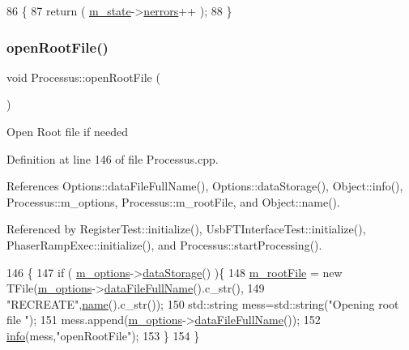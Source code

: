 \begin{DoxyCode}
86                                 \{
87   \textcolor{keywordflow}{return} ( \hyperlink{classProcessus_ab3539eee42891ceae0baf4395ae7fb61}{m\_state}->\hyperlink{structProcState_a51a0f54ba62b07e07ac8518c5f32828d}{nerrors}++ );
88 \}
\end{DoxyCode}
\mbox{\label{classProcessus_aacf6812880c1d1a2bf14a4a39458f443}} 
\subsubsection{\texorpdfstring{open\+Root\+File()}{openRootFile()}}
{\footnotesize\ttfamily void Processus\+::open\+Root\+File (\begin{DoxyParamCaption}{ }\end{DoxyParamCaption})\hspace{0.3cm}{\ttfamily [inherited]}}

Open Root file if needed 

Definition at line 146 of file Processus.\+cpp.



References Options\+::data\+File\+Full\+Name(), Options\+::data\+Storage(), Object\+::info(), Processus\+::m\+\_\+options, Processus\+::m\+\_\+root\+File, and Object\+::name().



Referenced by Register\+Test\+::initialize(), Usb\+F\+T\+Interface\+Test\+::initialize(), Phaser\+Ramp\+Exec\+::initialize(), and Processus\+::start\+Processing().


\begin{DoxyCode}
146                                \{
147   \textcolor{keywordflow}{if} ( \hyperlink{classProcessus_a74205f3c1e00c4448f7b3257c2351797}{m\_options}->\hyperlink{classOptions_aed7799d10139fa542055b982cb820192}{dataStorage}() )\{
148     \hyperlink{classProcessus_a76114f8cf2111e910c323a7ae05a015d}{m\_rootFile} = \textcolor{keyword}{new} TFile(\hyperlink{classProcessus_a74205f3c1e00c4448f7b3257c2351797}{m\_options}->\hyperlink{classOptions_ab1cd9f237e9c18fd72323c74565453f8}{dataFileFullName}().c\_str(),
149                            \textcolor{stringliteral}{"RECREATE"},\hyperlink{classObject_a300f4c05dd468c7bb8b3c968868443c1}{name}().c\_str());
150         std::string mess=std::string(\textcolor{stringliteral}{"Opening root file "});
151         mess.append(\hyperlink{classProcessus_a74205f3c1e00c4448f7b3257c2351797}{m\_options}->\hyperlink{classOptions_ab1cd9f237e9c18fd72323c74565453f8}{dataFileFullName}());
152         \hyperlink{classObject_a644fd329ea4cb85f54fa6846484b84a8}{info}(mess,\textcolor{stringliteral}{"openRootFile"});
153   \}
154 \}
\end{DoxyCode}
\mbox{\label{classAttrib_a7d4ef7e32d93cb287792b87b857e79f3}} 
